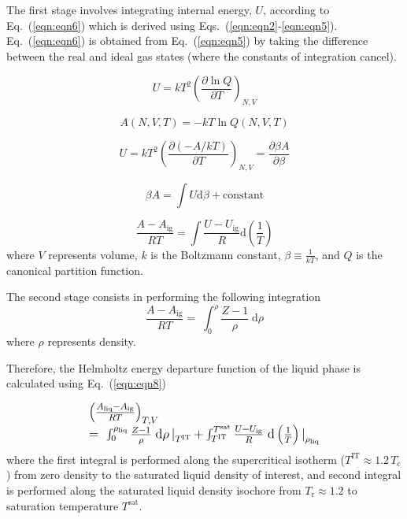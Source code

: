 \documentclass[5p,times]{elsarticle}
\begin{document}
The first stage involves integrating internal energy, $U$, according to Eq.~(\ref{eqn:eqn6}) which is derived using Eqs.~(\ref{eqn:eqn2}-\ref{eqn:eqn5}). Eq.~(\ref{eqn:eqn6}) is obtained from Eq.~(\ref{eqn:eqn5}) by taking the difference between the real and ideal gas states (where the constants of integration cancel). 

\begin{equation}
U=kT^{2} \left( \frac{\partial \ln Q}{\partial T}\right) _{N,V}  \label{eqn:eqn2}
\end{equation}

\begin{equation}
A \left( N,V,T \right)=-kT \ln Q\left(N,V,T\right)
\label{eqn:eqn3}
\end{equation}

\begin{equation}
U=kT^{2} \left( \frac{\partial (-A/kT)}{\partial T} \right)_{N,V} =\frac{\partial \beta A}{\partial \beta }  \label{eqn:eqn4}
\end{equation}

\begin{equation}
\beta A=\int U\mathrm{d} \beta + \mathrm{constant}  \label{eqn:eqn5}
\end{equation}

\begin{equation}
 \frac{A-A_\mathrm{ig} }{RT} =\int \frac{U-U_\mathrm{ig}}{R} \mathrm{d}\left( \frac{1}{T} \right) \label{eqn:eqn6}
\end{equation}
where $V$ represents volume,  $k$ is the Boltzmann constant, $\beta \equiv \frac{1}{kT}$, and $Q$ is the canonical partition function.


The second stage consists in performing the following integration
\begin{equation}
\frac{A-A_\mathrm{ig}}{RT} =\; \int _{0}^{\rho }\frac{Z-1}{\rho } \; \mathrm{d}\rho \label{eqn:eqn7}
\end{equation}
where $\rho$ represents density.

Therefore, the Helmholtz energy departure function of the liquid phase is calculated using Eq.~(\ref{eqn:eqn8})

\begin{equation}
\begingroup
\large
\begin{array}{l}
\left( \frac{A_\mathrm{liq} -A_\mathrm{ig} }{RT} \right)_{T,V}
\\ 
{=\; \int _{0}^{\rho _{\mathrm{liq}} }\frac{Z-1}{\rho } \; \mathrm{d}\rho \mathop{|}\nolimits_{T^{\mathrm{IT}}} +\int _{T^{\mathrm{IT}}}^{T^{\mathrm{\mathrm{sat}}}
} \frac{U-U_\mathrm{ig}}{R} \; \mathrm{d} \left(\frac{1}{T} \right) \mathop{|}\nolimits_{\rho _{\mathrm{liq}}}}  
\end{array} 
\endgroup
\label{eqn:eqn8}
\end{equation}
where the first integral is performed along the supercritical isotherm ($T^{\mathrm{IT}} \approx 1.2\,T_\mathrm{c}$) from zero density to the saturated liquid density of interest, and second integral is performed along the saturated liquid density isochore from $T_\mathrm{r} \approx 1.2$ to saturation temperature $T^\mathrm{sat}$.
\end{document}
